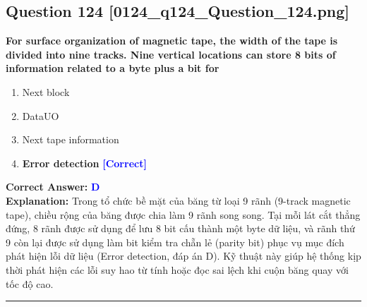 \documentclass[11pt,a4paper]{article}
\begin{document}
\begin{minipage}{\textwidth}
\subsection*{Question 124 \quad \footnotesize{[0124\_q124\_Question\_124.png]}}
\noindent \textbf{For surface organization of magnetic tape, the width of the tape is divided into nine tracks. Nine vertical locations can store 8 bits of information related to a byte plus a bit for}

\begin{enumerate}[label=\Alph*.]
    \item Next block
    \item DataUO
    \item Next tape information
    \item \textbf{Error detection} \hfill \textcolor{blue}{\textbf{[Correct]}}
\end{enumerate}

\noindent \textbf{Correct Answer:} \textcolor{blue}{\textbf{D}} \\[2pt]
\noindent \textbf{Explanation:} Trong tổ chức bề mặt của băng từ loại 9 rãnh (9-track magnetic tape), chiều rộng của băng được chia làm 9 rãnh song song. Tại mỗi lát cắt thẳng đứng, 8 rãnh được sử dụng để lưu 8 bit cấu thành một byte dữ liệu, và rãnh thứ 9 còn lại được sử dụng làm bit kiểm tra chẵn lẻ (parity bit) phục vụ mục đích phát hiện lỗi dữ liệu (Error detection, đáp án D). Kỹ thuật này giúp hệ thống kịp thời phát hiện các lỗi suy hao từ tính hoặc đọc sai lệch khi cuộn băng quay với tốc độ cao.

\par\vspace{0.3cm}
\hrule
\vspace{0.3cm}
\end{minipage}
\end{document}

